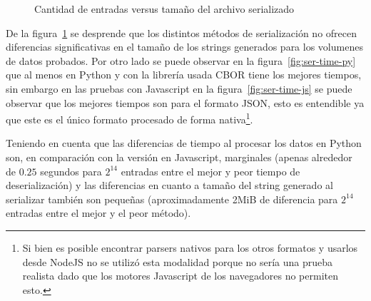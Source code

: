 \begin{figure}
    \centering
    \begin{framed}
    \end{framed}
    \caption{Cantidad de entradas versus tamaño del archivo serializado}
    \label{fig:ser-size}
\end{figure}

De la figura~\ref{fig:ser-size} se desprende que los distintos métodos de
serialización no ofrecen diferencias significativas en el tamaño de los
strings generados para los volumenes de datos probados. Por otro lado
se puede observar en la figura~\ref{fig:ser-time-py} que al menos en
Python y con la librería usada CBOR tiene los mejores tiempos, sin
embargo en las pruebas con Javascript en la figura~\ref{fig:ser-time-js}
se puede observar que los mejores tiempos son para el formato JSON,
esto es entendible ya que este es el único formato procesado de forma
nativa\footnote{Si bien es posible encontrar parsers nativos para los
otros formatos y usarlos desde NodeJS no se utilizó esta modalidad porque
no sería una prueba realista dado que los motores Javascript de los
navegadores no permiten esto.}.

Teniendo en cuenta que las diferencias de tiempo al procesar los datos
en Python son, en comparación con la versión en Javascript, marginales
(apenas alrededor de $0.25$ segundos para $2^{14}$
entradas entre el mejor y peor tiempo de deserialización) y las diferencias
en cuanto a tamaño del string generado al
serializar también son pequeñas (aproximadamente 2MiB de diferencia para
$2^{14}$ entradas entre el mejor y el peor método).
